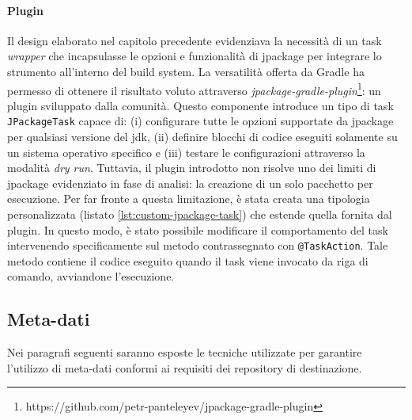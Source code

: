 \paragraph{Plugin} Il design elaborato nel capitolo precedente evidenziava la necessità di un task \textit{wrapper} che incapsulasse le opzioni e funzionalità di jpackage per integrare lo strumento all'interno del build system. La versatilità offerta da Gradle ha permesso di ottenere il risultato voluto attraverso \textit{jpackage-gradle-plugin}\footnote{https://github.com/petr-panteleyev/jpackage-gradle-plugin}: un plugin sviluppato dalla comunità. Questo componente introduce un tipo di task \texttt{JPackageTask} capace di: (i) configurare tutte le opzioni supportate da jpackage per qualsiasi versione del \ac{jdk}, (ii) definire blocchi di codice eseguiti solamente su un sistema operativo specifico e (iii) testare le configurazioni attraverso la modalità \textit{dry run}. Tuttavia, il plugin introdotto non risolve uno dei limiti di jpackage evidenziato in fase di analisi: la creazione di un solo pacchetto per esecuzione. Per far fronte a questa limitazione, è stata creata una tipologia personalizzata (listato \ref{lst:custom-jpackage-task}) che estende quella fornita dal plugin. In questo modo, è stato possibile modificare il comportamento del task intervenendo specificamente sul metodo contrassegnato con \texttt{@TaskAction}. Tale metodo contiene il codice eseguito quando il task viene invocato da riga di comando, avviandone l'esecuzione. 



\subsection{Meta-dati}

Nei paragrafi seguenti saranno esposte le tecniche utilizzate per garantire l'utilizzo di meta-dati conformi ai requisiti dei repository di destinazione.

